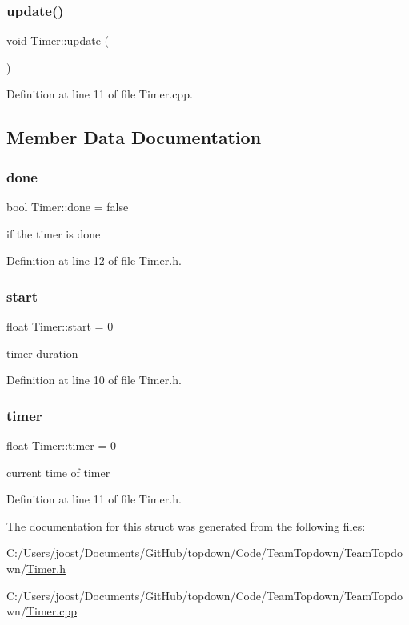 \subsubsection{\texorpdfstring{update()}{update()}}
{\footnotesize\ttfamily void Timer\+::update (\begin{DoxyParamCaption}{ }\end{DoxyParamCaption})}



Definition at line 11 of file Timer.\+cpp.



\subsection{Member Data Documentation}
\mbox{\label{struct_timer_aa460ddd1bec761b68d3b2d460c6e483f}} 
\subsubsection{\texorpdfstring{done}{done}}
{\footnotesize\ttfamily bool Timer\+::done = false}

if the timer is done 

Definition at line 12 of file Timer.\+h.

\mbox{\label{struct_timer_a6b75c3f5ce3277c8bea9c6d9ca96dcd7}} 
\subsubsection{\texorpdfstring{start}{start}}
{\footnotesize\ttfamily float Timer\+::start = 0}

timer duration 

Definition at line 10 of file Timer.\+h.

\mbox{\label{struct_timer_ad6268e1d17cd58eb4caffe2a1e3f00ee}} 
\subsubsection{\texorpdfstring{timer}{timer}}
{\footnotesize\ttfamily float Timer\+::timer = 0}

current time of timer 

Definition at line 11 of file Timer.\+h.



The documentation for this struct was generated from the following files\+:\begin{DoxyCompactItemize}
\item 
C\+:/\+Users/joost/\+Documents/\+Git\+Hub/topdown/\+Code/\+Team\+Topdown/\+Team\+Topdown/\hyperlink{_timer_8h}{Timer.\+h}\item 
C\+:/\+Users/joost/\+Documents/\+Git\+Hub/topdown/\+Code/\+Team\+Topdown/\+Team\+Topdown/\hyperlink{_timer_8cpp}{Timer.\+cpp}\end{DoxyCompactItemize}
